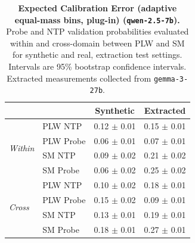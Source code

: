 \begin{table}[ht]
\centering
\begin{tabular}{ll cc}
\toprule
& & Synthetic & Extracted \\
\midrule
\multirow{4}{*}{\textit{Within}}
& PLW NTP & 0.12 $\pm$ 0.01 & 0.15 $\pm$ 0.01 \\
& PLW Probe & 0.06 $\pm$ 0.01 & 0.07 $\pm$ 0.01 \\
& SM NTP & 0.09 $\pm$ 0.02 & 0.21 $\pm$ 0.02 \\
& SM Probe & 0.06 $\pm$ 0.02 & 0.25 $\pm$ 0.02 \\
\midrule
\multirow{4}{*}{\textit{Cross}}
& PLW NTP & 0.10 $\pm$ 0.02 & 0.18 $\pm$ 0.01 \\
& PLW Probe & 0.15 $\pm$ 0.02 & 0.09 $\pm$ 0.01 \\
& SM NTP & 0.13 $\pm$ 0.01 & 0.19 $\pm$ 0.01 \\
& SM Probe & 0.18 $\pm$ 0.01 & 0.27 $\pm$ 0.01 \\
\bottomrule
\end{tabular}
\caption{\textbf{Expected Calibration Error (adaptive equal-mass bins, plug-in) (\texttt{qwen-2.5-7b}).} Probe and NTP validation probabilities evaluated within and cross-domain between PLW and SM for synthetic and real, extraction test settings. Intervals are 95\% bootstrap confidence intervals. Extracted measurements collected from \texttt{gemma-3-27b}.}
\label{tab:qwen-2.5-7b-gemma-3-27b-pond_supermat-ece_em}
\end{table}
